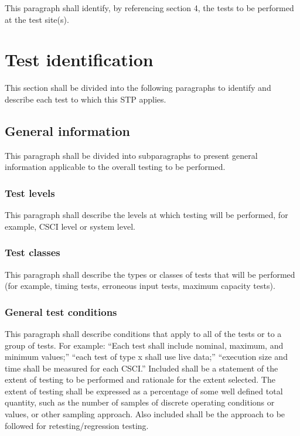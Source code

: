 \documentclass{fidata-report-template}
\begin{document}
This paragraph shall identify, by referencing section 4, the tests to be
performed at the test site(s).

\section{Test identification}

This section shall be divided into the following paragraphs to identify
and describe each test to which this STP applies.

\subsection{General information}

This paragraph shall be divided into subparagraphs to present general
information applicable to the overall testing to be performed.

\subsubsection{Test levels}

This paragraph shall describe the levels at which testing will be
performed, for example, CSCI level or system level.

\subsubsection{Test classes}

This paragraph shall describe the types or classes of tests that will be
performed (for example, timing tests, erroneous input tests, maximum
capacity tests).

\subsubsection{General test conditions}

This paragraph shall describe conditions that apply to all of the tests
or to a group of tests. For example: ``Each test shall include nominal,
maximum, and minimum values;'' ``each test of type x shall use live
data;'' ``execution size and time shall be measured for each CSCI.''
Included shall be a statement of the extent of testing to be performed
and rationale for the extent selected. The extent of testing shall be
expressed as a percentage of some well defined total quantity, such as
the number of samples of discrete operating conditions or values, or
other sampling approach. Also included shall be the approach to be
followed for retesting/regression testing.
\end{document}
